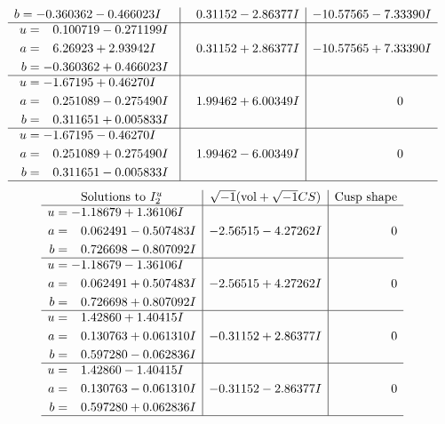 \documentclass[1p]{elsarticle_modified}
\theoremstyle{definition}
\newcommand{\I}{\sqrt{-1}}
\begin{document}
$$\begin{array}{c|c|c}
\begin{aligned}
b &= -0.360362 - 0.466023 I\end{aligned}
 & \phantom{-}0.31152 - 2.86377 I & -10.57565 - 7.33390 I \\ \hline\begin{aligned}
u &= \phantom{-}0.100719 - 0.271199 I \\
a &= \phantom{-}6.26923 + 2.93942 I \\
b &= -0.360362 + 0.466023 I\end{aligned}
 & \phantom{-}0.31152 + 2.86377 I & -10.57565 + 7.33390 I \\ \hline\begin{aligned}
u &= -1.67195 + 0.46270 I \\
a &= \phantom{-}0.251089 - 0.275490 I \\
b &= \phantom{-}0.311651 + 0.005833 I\end{aligned}
 & \phantom{-}1.99462 + 6.00349 I & \phantom{-0.000000 } 0 \\ \hline\begin{aligned}
u &= -1.67195 - 0.46270 I \\
a &= \phantom{-}0.251089 + 0.275490 I \\
b &= \phantom{-}0.311651 - 0.005833 I\end{aligned}
 & \phantom{-}1.99462 - 6.00349 I & \phantom{-0.000000 } 0\\
 \hline 
 \end{array}$$\newpage$$\begin{array}{c|c|c}  
\text{Solutions to }I^u_{2}& \I (\text{vol} + \sqrt{-1}CS) & \text{Cusp shape}\\
 \hline 
\begin{aligned}
u &= -1.18679 + 1.36106 I \\
a &= \phantom{-}0.062491 - 0.507483 I \\
b &= \phantom{-}0.726698 - 0.807092 I\end{aligned}
 & -2.56515 - 4.27262 I & \phantom{-0.000000 } 0 \\ \hline\begin{aligned}
u &= -1.18679 - 1.36106 I \\
a &= \phantom{-}0.062491 + 0.507483 I \\
b &= \phantom{-}0.726698 + 0.807092 I\end{aligned}
 & -2.56515 + 4.27262 I & \phantom{-0.000000 } 0 \\ \hline\begin{aligned}
u &= \phantom{-}1.42860 + 1.40415 I \\
a &= \phantom{-}0.130763 + 0.061310 I \\
b &= \phantom{-}0.597280 - 0.062836 I\end{aligned}
 & -0.31152 + 2.86377 I & \phantom{-0.000000 } 0 \\ \hline\begin{aligned}
u &= \phantom{-}1.42860 - 1.40415 I \\
a &= \phantom{-}0.130763 - 0.061310 I \\
b &= \phantom{-}0.597280 + 0.062836 I\end{aligned}
 & -0.31152 - 2.86377 I & \phantom{-0.000000 } 0\\
 \hline 
 \end{array}$$\newpage
\end{document}
